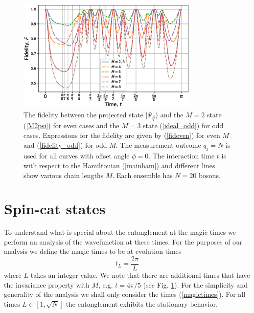 \documentclass[12pt]{iopart}
\begin{document}
\begin{figure}[ht]
    \centering
    \includegraphics[width=0.8\textwidth]{fidelity-n30}
    \caption{The fidelity between the projected state $ | \Psi_{\vec{q}} \rangle  $ and the $ M = 2$ state (\ref{M2psi}) for even cases and the $ M = 3$ state (\ref{ideal_odd}) for odd cases.  Expressions for the fidelity are given by 
       (\ref{fideven}) for even $ M $ and (\ref{fidelity_odd}) for odd $ M $.  The measurement outcome $ q_j = N $ is used for all curves with offset angle $ \phi = 0 $.  The interaction time $ t $ is with respect to the Hamiltonian (\ref{mainham}) and different lines show various chain lengths $ M $. Each ensemble has $ N = 20 $ bosons. }
    \label{fig:fidelity}
\end{figure}

























\section{Spin-cat states}

To understand what is special about the entanglement at the magic times we perform an analysis of the wavefunction at these times.  For the purposes of our analysis we define the magic times to be at evolution times 
%
\begin{equation}
t_L = \frac{2\pi}{L}
\label{magictimes}
\end{equation}
%
where $L $ takes an integer value. We note that there are additional times that have the invariance property with $ M$, e.g. $ t = 4\pi/5 $ (see Fig. \ref{fig:fidelity}). For the simplicity and generality of the analysis we shall only consider the times (\ref{magictimes}).  For all times  $ L \in [1, \sqrt{N} ] $ the entanglement exhibits the stationary behavior.  
\end{document}
